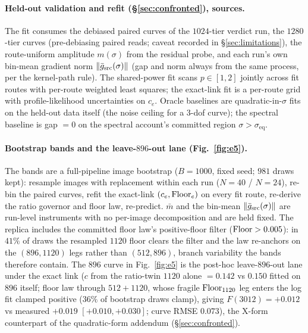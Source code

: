 \paragraph{Held-out validation and refit (\S\ref{sec:confronted}),
sources.} The fit consumes the debiased paired curves of the
$1024$-tier verdict run, the $1280$-tier curves (pre-debiasing paired
reads; caveat recorded in \S\ref{sec:limitations}), the route-uniform
amplitude $m(\sigma)$ from the residual probe, and each run's own bin-mean
gradient norm $\|\bar g_{\mathrm{src}}(\sigma)\|$ (gap and norm always from the same process, per the
kernel-path rule). The shared-power fit scans $p \in [1, 2]$ jointly
across fit routes with per-route weighted least squares; the exact-link
fit is a per-route grid with profile-likelihood uncertainties on $c_e$.
Oracle baselines are quadratic-in-$\sigma$ fits on the held-out data
itself (the noise ceiling for a 3-dof curve); the spectral baseline is
gap $= 0$ on the spectral account's committed region
$\sigma > \sigma_{\mathrm{eq}}$.

\paragraph{Bootstrap bands and the leave-$896$-out lane
(Fig.~\ref{fig:e5}).} The bands are a full-pipeline image bootstrap
($B{=}1000$, fixed seed; $981$ draws kept): resample images with
replacement within each run ($N{=}40$ / $N{=}24$), re-bin the paired
curves, refit the exact-link $(c_e, \mathrm{Floor}_e)$ on every fit route,
re-derive the ratio governor and floor law, re-predict. $\bar m$ and
the bin-mean $\|\bar g_{\mathrm{src}}(\sigma)\|$ are run-level instruments with no per-image
decomposition and are held fixed. The replica includes the committed
floor law's positive-floor filter ($\mathrm{Floor} > 0.005$): in $41\%$ of
draws the resampled $1120$ floor clears the filter and the law
re-anchors on the $(896, 1120)$ legs rather than $(512, 896)$,
branch variability the bands therefore contain. The $896$ curve in
Fig.~\ref{fig:e5} is the post-hoc leave-$896$-out lane under the exact
link ($c$ from the ratio-twin $1120$ alone $= 0.142$ vs $0.150$ fitted
on $896$ itself; floor law through $512{+}1120$, whose fragile
$\mathrm{Floor}_{1120}$ leg enters the log fit clamped positive ($36\%$ of
bootstrap draws clamp), giving $F(3012) = +0.012$ vs measured
$+0.019$ $[+0.010, +0.030]$; curve RMSE $0.073$), the X-form
counterpart of the quadratic-form addendum
(\S\ref{sec:confronted}).

